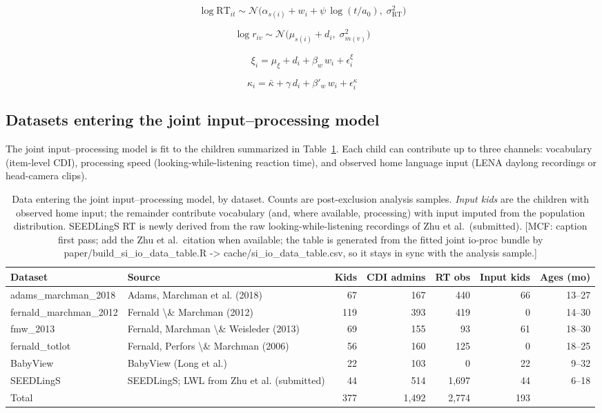 \documentclass[
  11pt,
]{article}
\begin{document}
\[\log \mathrm{RT}_{it} \sim \mathcal N\!\big(\alpha_{s(i)} + w_i + \psi\,\log(t/a_0),\; \sigma_{\mathrm{RT}}^2\big)\]

\[\log r_{iv} \sim \mathcal N\!\big(\mu_{s(i)} + d_i,\; \sigma^2_{m(v)}\big)\]

\[\xi_i    = \mu_\xi + d_i + \beta_w\,w_i + \epsilon^\xi_i\]

\[\kappa_i = \bar\kappa + \gamma\,d_i + \beta'_w\,w_i + \epsilon^\kappa_i\]

\subsection{Datasets entering the joint input--processing
model}\label{datasets-entering-the-joint-inputprocessing-model}

The joint input--processing model is fit to the children summarized in
Table~\ref{tbl-io-datasets}. Each child can contribute up to three
channels: vocabulary (item-level CDI), processing speed
(looking-while-listening reaction time), and observed home language
input (LENA daylong recordings or head-camera clips).

\begingroup\fontsize{9}{11}\selectfont

\begin{longtable}[t]{llrrrrr}

\caption{\label{tbl-io-datasets}Data entering the joint
input--processing model, by dataset. Counts are post-exclusion analysis
samples. \emph{Input kids} are the children with observed home input;
the remainder contribute vocabulary (and, where available, processing)
with input imputed from the population distribution. SEEDLingS RT is
newly derived from the raw looking-while-listening recordings of Zhu et
al.~(submitted). {[}MCF: caption first pass; add the Zhu et al.~citation
when available; the table is generated from the fitted joint io-proc
bundle by paper/build\_si\_io\_data\_table.R -\textgreater{}
cache/si\_io\_data\_table.csv, so it stays in sync with the analysis
sample.{]}}

\tabularnewline

\toprule
Dataset & Source & Kids & CDI admins & RT obs & Input kids & Ages (mo)\\
\midrule
adams\_marchman\_2018 & Adams, Marchman et al. (2018) & 67 & 167 & 440 & 66 & 13--27\\
fernald\_marchman\_2012 & Fernald \textbackslash{}\& Marchman (2012) & 119 & 393 & 419 & 0 & 14--30\\
fmw\_2013 & Fernald, Marchman \textbackslash{}\& Weisleder (2013) & 69 & 155 & 93 & 61 & 18--30\\
fernald\_totlot & Fernald, Perfors \textbackslash{}\& Marchman (2006) & 56 & 160 & 125 & 0 & 18--25\\
BabyView & BabyView (Long et al.) & 22 & 103 & 0 & 22 & 9--32\\
\addlinespace
SEEDLingS & SEEDLingS; LWL from Zhu et al. (submitted) & 44 & 514 & 1,697 & 44 & 6--18\\
\midrule
Total &  & 377 & 1,492 & 2,774 & 193 & \\
\bottomrule

\end{longtable}
\end{document}
